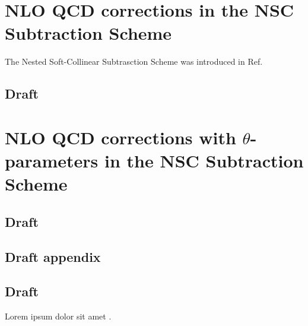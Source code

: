 \documentclass[a4paper, 12pt]{book}
\begin{document}
\clearpage

\chapter{NLO QCD corrections in the NSC Subtraction Scheme}
\label{NSC-SS}

The Nested Soft-Collinear Subtrasction Scheme was introduced in Ref. \cite{Caola:2017dug}

\section{Draft}

\clearpage

\chapter{NLO QCD corrections with $\theta$-parameters in the NSC Subtraction Scheme}
\label{NSC-SS-parameters}

\section{Draft}

\clearpage

\begin{appendices}
\pagestyle{append}

\chapter{Draft appendix}

\section{Draft}

Lorem ipsum dolor sit amet \cite{pauli}.

\clearpage
\end{appendices}

\pagestyle{biblio}
\printbibliography[heading = bibintoc, title = {Bibliography}]
\end{document}
